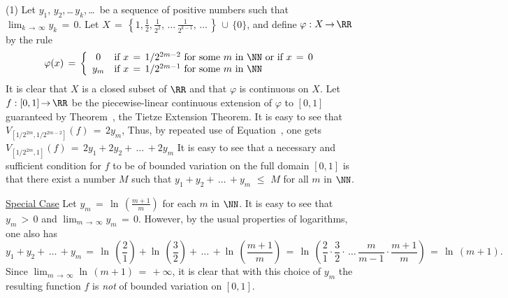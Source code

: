        (1) Let $y_{1}$, $y_{2}$,\,{\ldots}\,$y_{k}$,\,{\ldots}\, be a sequence of positive numbers such that $\lim_{k \,{\rightarrow}\, {\infty}} y_{k} \,=\, 0$.
    Let $X \,=\, {\displaystyle \left\{1, \frac{1}{2}, \frac{1}{2^{2}},\,{\ldots}\,\frac{1}{2^{k-1}},\,{\ldots}\,\right\}\,{\cup}\,\{0\}}$, and define ${\varphi}:X \,{\rightarrow}\, {\RR}$ by the rule
        \begin{displaymath}
        {\varphi}(x) \,=\, \left\{
        \begin{array}{cl}
        0 & \mbox{if $x \,=\, 1/2^{2m-2}$ for some $m$ in ${\NN}$ or if $x \,=\, 0$} \\
        y_{m} & \mbox{if  $x \,=\, 1/2^{2m-1}$ for some $m$ in ${\NN}$}
        \end{array}
                            \right.
        \end{displaymath}
    It is clear that $X$ is a closed subset of ${\RR}$ and that ${\varphi}$ is continuous on $X$.
    Let $f:[0,1] \,{\rightarrow}\, {\RR}$ be the piecewise-linear continuous extension of ${\varphi}$ to $[0,1]$ guaranteed by Theorem~,
    the Tietze Extension Theorem.
    It is easy to see that $V_{[1/2^{2m},1/2^{2m-2}]}(f) \,=\,2y_{m}$, Thus, by repeated use of Equation~, one gets
        $V_{[1/2^{2m},1]}(f) \,=\, 2y_{1} + 2y_{2} + \,{\ldots}\, + 2y_{m}$
    It is easy to see that a necessary and sufficient condition for $f$ to be of bounded variation on the full domain $[0,1]$ is that there exist a number $M$ such that $y_{1} + y_{2} + \,{\ldots}\, + y_{m}\,\,{\leq}\,\,M$ for all $m$ in ${\NN}$.

        \underline{Special Case} Let $y_{m} \,=\, {\ln}\,{\displaystyle \left(\frac{m+1}{m}\right)}$ for each $m$ in ${\NN}$.
    It is easy to see that $y_{m}\,>\,0$ and $\lim_{m \,{\rightarrow}\, {\infty}} y_{m} \,=\, 0$.
    However, by the usual properties of logarithms, one also has
        \begin{displaymath}
        y_{1} + y_{2} + \,{\ldots}\,+ y_{m}  \,=\, {\ln}\,\left(\frac{2}{1}\right) + {\ln}\,\left(\frac{3}{2}\right) + \,{\ldots}\,+ {\ln}\,\left(\frac{m+1}{m}\right) \,=\, 
    {\ln}\,\left(\frac{2}{1}{\cdot}\frac{3}{2}{\cdot}\,{\ldots}\,\frac{m}{m-1}{\cdot}\frac{m+1}{m}\right) \,=\, {\ln}\,(m+1).
        \end{displaymath}
    Since $\lim_{m \,{\rightarrow}\, {\infty}} {\ln}\,(m+1) \,=\, +{\infty}$, it is clear that with this choice of $y_{m}$ the resulting function $f$ is {\em not} of bounded variation on $[0,1]$.

